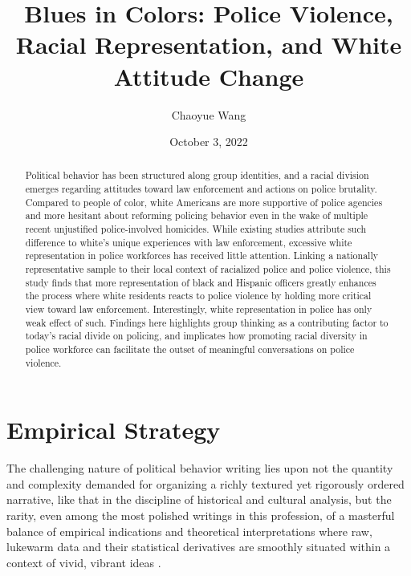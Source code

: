 \documentclass[
  11pt,
]{article}
\title{\textbf{Blues in Colors: Police Violence, Racial Representation,
and White Attitude Change}}
\author{Chaoyue Wang}
\date{October 3, 2022}
\begin{document}
\maketitle
\begin{abstract}
Political behavior has been structured along group identities, and a
racial division emerges regarding attitudes toward law enforcement and
actions on police brutality. Compared to people of color, white
Americans are more supportive of police agencies and more hesitant about
reforming policing behavior even in the wake of multiple recent
unjustified police-involved homicides. While existing studies attribute
such difference to white's unique experiences with law enforcement,
excessive white representation in police workforces has received little
attention. Linking a nationally representative sample to their local
context of racialized police and police violence, this study finds that
more representation of black and Hispanic officers greatly enhances the
process where white residents reacts to police violence by holding more
critical view toward law enforcement. Interestingly, white
representation in police has only weak effect of such. Findings here
highlights group thinking as a contributing factor to today's racial
divide on policing, and implicates how promoting racial diversity in
police workforce can facilitate the outset of meaningful conversations
on police violence.
\end{abstract}

\ifdefined\Shaded\renewenvironment{Shaded}{\begin{tcolorbox}[boxrule=0pt, borderline west={3pt}{0pt}{shadecolor}, frame hidden, breakable, enhanced, interior hidden, sharp corners]}{\end{tcolorbox}}\fi

\hypertarget{empirical-strategy}{%
\section{Empirical Strategy}\label{empirical-strategy}}

The challenging nature of political behavior writing lies upon not the
quantity and complexity demanded for organizing a richly textured yet
rigorously ordered narrative, like that in the discipline of historical
and cultural analysis, but the rarity, even among the most polished
writings in this profession, of a masterful balance of empirical
indications and theoretical interpretations where raw, lukewarm data and
their statistical derivatives are smoothly situated within a context of
vivid, vibrant ideas \autocite{egan2020,mason2018,abrajano2015}.
\end{document}
